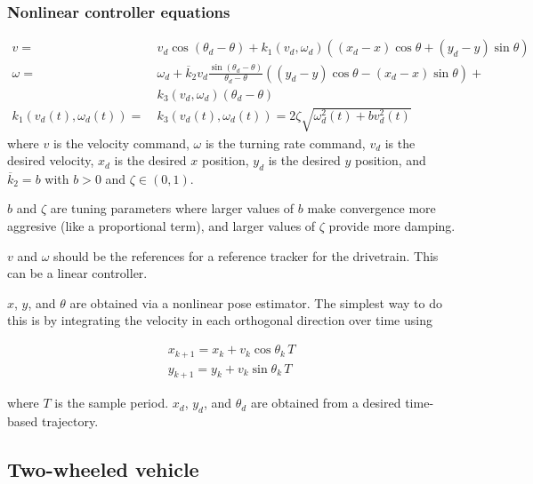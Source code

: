 \subsubsection{Nonlinear controller equations}

\begin{theorem}
  \begin{align}
    v =~& v_d \cos(\theta_d - \theta) + k_1(v_d, \omega_d)((x_d - x)\cos\theta +
      (y_d - y)\sin\theta) \\
    \omega =~& \omega_d +
      \overline{k}_2 v_d\frac{\sin(\theta_d - \theta)}{\theta_d - \theta}
      ((y_d - y)\cos\theta - (x_d - x)\sin\theta) + \nonumber \\
      &k_3 (v_d, \omega_d)(\theta_d - \theta) \\
    k_1(v_d(t), \omega_d(t)) =~& k_3(v_d(t), \omega_d(t)) =
      2\zeta\sqrt{\omega_d^2(t) + bv_d^2(t)}
  \end{align}
  where $v$ is the velocity command, $\omega$ is the turning rate command, $v_d$
  is the desired velocity, $x_d$ is the desired $x$ position, $y_d$ is the
  desired $y$ position, and $\overline{k}_2 = b$ with $b > 0$ and
  $\zeta \in (0, 1)$.

  $b$ and $\zeta$ are tuning parameters where larger values of $b$ make
  convergence more aggresive (like a proportional term), and larger values of
  $\zeta$ provide more damping.
\end{theorem}

$v$ and $\omega$ should be the \glspl{reference} for a \gls{reference} tracker
for the drivetrain. This can be a linear controller.

$x$, $y$, and $\theta$ are obtained via a nonlinear \gls{pose} estimator. The
simplest way to do this is by integrating the velocity in each orthogonal
direction over time using

\begin{align*}
  x_{k+1} = x_k + v_k\cos\theta_k\,T \\
  y_{k+1} = y_k + v_k\sin\theta_k\,T
\end{align*}

where $T$ is the sample period. $x_d$, $y_d$, and $\theta_d$ are obtained from a
desired time-based trajectory.

\subsection{Two-wheeled vehicle}

